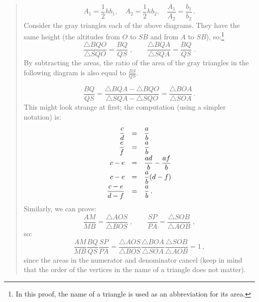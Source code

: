 \begin{quote}
\[
A_1 = \frac{1}{2}hb_1,\quad A_2 = \frac{1}{2}hb_2, \quad \frac{A_1}{A_2}=\frac{b_1}{b_2}\,.
\]
Consider the gray triangles each of the above diagrams. They have the same height (the altitudes from $O$ to $SB$ and from $A$ to $SB$), so:\footnote{In this proof, the name of a triangle is used as an abbreviation for its area.}
\[\frac{\triangle BQO}{\triangle SQO} = \frac{BQ}{QS}\;,\quad\quad \frac{\triangle BQA}{\triangle SQA} = \frac{BQ}{QS}\;.
\]
By subtracting the areas, the ratio of the area of the gray triangles in the following diagram is also equal to $\frac{BS}{QS}$.
\begin{center}
\vspace*{-8pt}
\vspace*{-6pt}
\end{center}
\[
\frac{BQ}{QS} = \frac{\triangle BQA - \triangle BQO}{\triangle SQA-\triangle SQO} = \frac{\triangle BOA}{\triangle SOA}\,.
\]
This might look strange at first; the computation (using a simpler notation) is:
\[
\renewcommand*{\arraystretch}{1.6}
\begin{array}{rcl}
 \disfrac{c}{d} &=&\disfrac{a}{b}\\
 \disfrac{e}{f} &=&\disfrac{a}{b}\\
c-e &=& \disfrac{ad}{b} - \disfrac{af}{b}\\
c-e &=& \disfrac{a}{b}(d-f)\\
\disfrac{c-e}{d-f} &=& \disfrac{a}{b}\,.
\end{array}
\]
Similarly, we can prove:
\[
\frac{AM}{MB} = \frac{\triangle AOS}{\triangle BOS}\;,\quad\quad \frac{SP}{PA} =\frac{\triangle SOB}{\triangle AOB}\;,
\]
so:
\[
\frac{AM}{MB}\frac{BQ}{QS}\frac{SP}{PA} = \frac{\triangle AOS}{\triangle BOS}\frac{\triangle BOA}{\triangle SOA}\frac{\triangle SOB}{\triangle AOB}=1\,,
\]
since the areas in the numerator and denominator cancel (keep in mind that the order of the vertices in the name of a triangle does not matter).
\vspace*{-8pt}
\end{quote}
